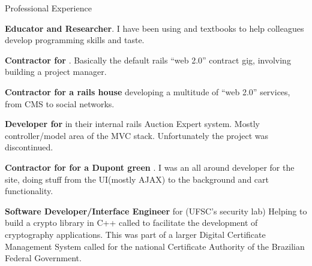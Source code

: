 \begin{rubric}{Professional Experience}{


    \entry*[2009]
        \textbf{Educator and Researcher}. I have been using 
         and
        textbooks to help colleagues develop programming skills and taste.

    \entry*[2009] 
        \textbf{Contractor for
        }. Basically the
        default rails ``web 2.0'' contract gig, involving building a project
        manager.

    \entry*[2007 - 2008] 
        \textbf{Contractor for  a rails house} 
        developing a multitude of ``web 2.0'' services, from CMS to social networks.

    \entry*[2007] 
        \textbf{Developer for } 
        in their internal rails Auction Expert system. Mostly controller/model area of
        the MVC stack. Unfortunately the project was discontinued.

    \entry*[2007] 
        \textbf{Contractor for  
        for a Dupont green }.
        I was an all around developer for the site, doing stuff from the
        UI(mostly AJAX) to the background and cart functionality.

    \entry*[2005 - 2007] 
        \textbf{Software Developer/Interface Engineer} for
        (UFSC's security
        lab) Helping to build a crypto library in C++ called
        to facilitate the development of cryptography applications. This was
        part of a larger Digital Certificate Management System  called
         for the
        national Certificate Authority of the Brazilian Federal Government.

}\end{rubric}


